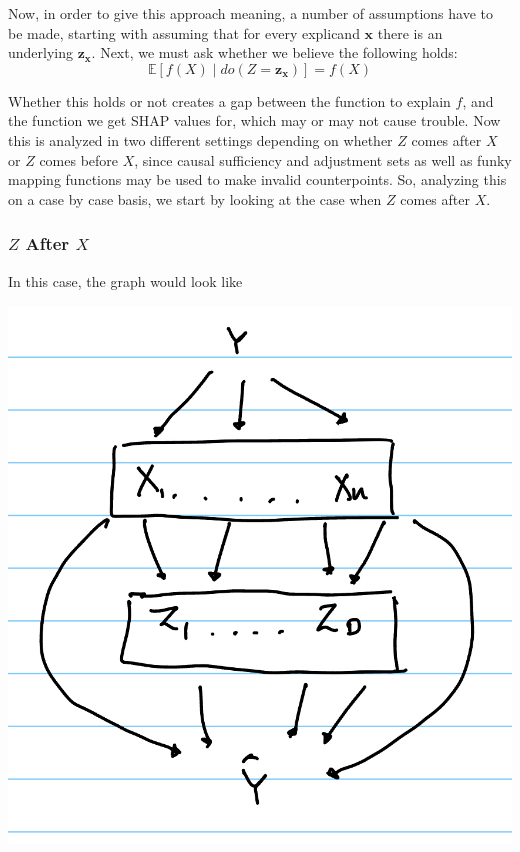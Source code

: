 \documentclass{article}
\begin{document}
Now, in order to give this approach meaning, a number of assumptions have to be made, starting with assuming that for every explicand $\mathbf{x}$ there is an underlying $\mathbf{z}_{\mathbf{x}}$. Next, we must ask whether we believe the following holds:
\[
\mathbb{E}[f(X) \mid do(Z = \mathbf{z}_{\mathbf{x}})] = f(X)
\]

Whether this holds or not creates a gap between the function to explain $f$, and the function we get SHAP values for, which may or may not cause trouble. Now this is analyzed in two different settings depending on whether $Z$ comes after $X$ or $Z$ comes before $X$, since causal sufficiency and adjustment sets as well as funky mapping functions may be used to make invalid counterpoints. So, analyzing this on a case by case basis, we start by looking at the case when $Z$ comes after $X$.


\subsubsection{$Z$ After $X$}

In this case, the graph would look like

\begin{center}
\includegraphics[scale=0.2]{Z_after_X.jpeg}
\end{center}
\end{document}
